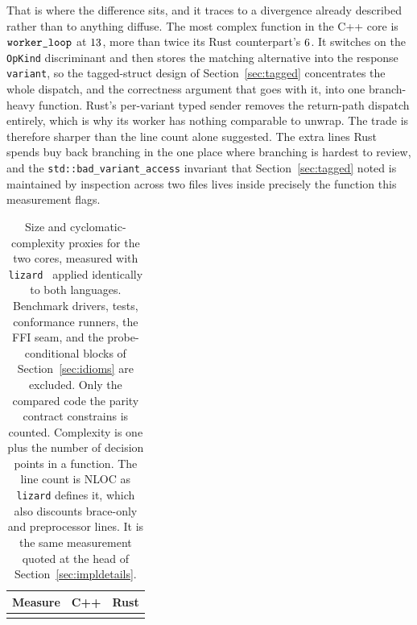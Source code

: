 \documentclass[english,twoside,openright,a4paper,censored,csm,software-track-2020]{HYthesisML}
\begin{document}
That is where the difference sits, and it traces to a divergence already described rather than
to anything diffuse. The most complex function in the C++ core is
$\texttt{worker\_loop}$ at $13$, more than twice its Rust counterpart's $6$. It
switches on the \texttt{OpKind} discriminant and then stores the matching alternative into the
response \texttt{variant}, so the tagged-struct design of Section~\ref{sec:tagged} concentrates
the whole dispatch, and the correctness argument that goes with it, into one branch-heavy
function. Rust's per-variant typed sender removes the return-path dispatch entirely, which is
why its worker has nothing comparable to unwrap. The trade is therefore sharper than the line
count alone suggested. The extra lines Rust spends buy back branching in the one place where
branching is hardest to review, and the \texttt{std::bad\_variant\_access} invariant that
Section~\ref{sec:tagged} noted is maintained by inspection across two files lives inside
precisely the function this measurement flags.

\begin{table}[H]
\centering
\small
\caption[Size and cyclomatic-complexity proxies for the two cores]{Size and cyclomatic-complexity proxies for the two cores, measured with
\texttt{lizard}~\cite{lizard} applied identically to both languages. Benchmark drivers, tests,
conformance runners, the FFI seam, and the probe-conditional blocks of
Section~\ref{sec:idioms} are excluded. Only the compared code the parity contract constrains is
counted. Complexity is one plus the number of decision points in a function. The line count is
NLOC as \texttt{lizard} defines it, which also discounts brace-only and preprocessor lines. It
is the same measurement quoted at the head of
Section~\ref{sec:impldetails}.\label{tab:complexity}}
\begin{tabular}{@{}l r r@{}}
\hline\hline
Measure & C++ & Rust \\
\hline
\\
\hline
\end{tabular}
\end{table}
\end{document}
